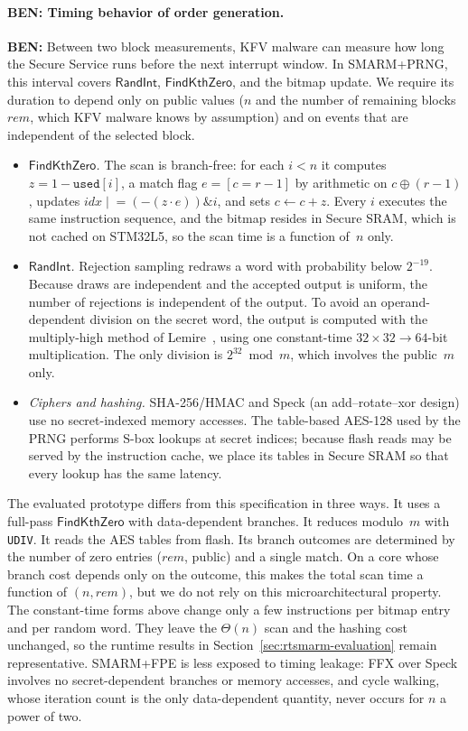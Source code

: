 \documentclass{ieeeaccess}
\DeclareRobustCommand{\ben}[1]{{\color{BENcolor}\textbf{BEN:} #1}}
\newcommand{\rtsmarmone}{SMARM+PRNG\xspace}
\newcommand{\rtsmarmtwo}{SMARM+FPE\xspace}
\begin{document}
\paragraph{\ben{Timing behavior of order generation.}}
\ben{Between two block measurements, KFV malware can measure how long the Secure Service runs before the next interrupt window.
In \rtsmarmone, this interval covers $\mathsf{RandInt}$, $\mathsf{FindKthZero}$, and the bitmap update.
We require its duration to depend only on public values ($n$ and the number of remaining blocks $rem$, which KFV malware knows by assumption) and on events that are independent of the selected block.
\begin{itemize}
  \item \emph{$\mathsf{FindKthZero}$.} The scan is branch-free: for each $i < n$ it computes $z = 1 - \texttt{used}[i]$, a match flag $e = [c = r-1]$ by arithmetic on $c \oplus (r-1)$, updates $idx \mathrel{|}= (-(z \cdot e)) \mathbin{\&} i$, and sets $c \gets c + z$.
  Every $i$ executes the same instruction sequence, and the bitmap resides in Secure SRAM, which is not cached on STM32L5, so the scan time is a function of~$n$ only.
  \item \emph{$\mathsf{RandInt}$.} Rejection sampling redraws a word with probability below $2^{-19}$. Because draws are independent and the accepted output is uniform, the number of rejections is independent of the output.
  To avoid an operand-dependent division on the secret word, the output is computed with the multiply-high method of Lemire~\cite{lemire2019fast}, using one constant-time $32 \times 32 \to 64$-bit multiplication. The only division is $2^{32} \bmod m$, which involves the public~$m$ only.
  \item \emph{Ciphers and hashing.} SHA-256/HMAC and Speck (an add--rotate--xor design) use no secret-indexed memory accesses.
  The table-based AES-128 used by the PRNG performs S-box lookups at secret indices; because flash reads may be served by the instruction cache, we place its tables in Secure SRAM so that every lookup has the same latency.
\end{itemize}
The evaluated prototype differs from this specification in three ways.
It uses a full-pass $\mathsf{FindKthZero}$ with data-dependent branches.
It reduces modulo~$m$ with \texttt{UDIV}.
It reads the AES tables from flash.
Its branch outcomes are determined by the number of zero entries ($rem$, public) and a single match.
On a core whose branch cost depends only on the outcome, this makes the total scan time a function of $(n, rem)$, but we do not rely on this microarchitectural property.
The constant-time forms above change only a few instructions per bitmap entry and per random word.
They leave the $\Theta(n)$ scan and the hashing cost unchanged, so the runtime results in Section~\ref{sec:rtsmarm-evaluation} remain representative.
\rtsmarmtwo is less exposed to timing leakage: FFX over Speck involves no secret-dependent branches or memory accesses, and cycle walking, whose iteration count is the only data-dependent quantity, never occurs for $n$ a power of two.}
\end{document}
